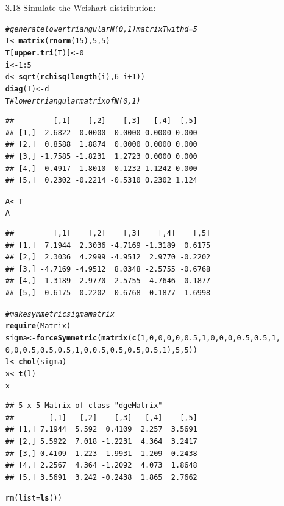 \documentclass{article}\usepackage[]{graphicx}\usepackage[]{color}
\makeatletter
\newcommand{\hlcom}[1]{\textcolor[rgb]{0.678,0.584,0.686}{\textit{#1}}}%
\newcommand{\hlkwd}[1]{\textcolor[rgb]{0.737,0.353,0.396}{\textbf{#1}}}%
\newenvironment{kframe}{%
 \def\at@end@of@kframe{}%
 \ifinner\ifhmode%
  \def\at@end@of@kframe{\end{minipage}}%
  \begin{minipage}{\columnwidth}%
 \fi\fi%
 \def\FrameCommand##1{\hskip\@totalleftmargin \hskip-\fboxsep
 \colorbox{shadecolor}{##1}\hskip-\fboxsep
     \hskip-\linewidth \hskip-\@totalleftmargin \hskip\columnwidth}%
 \MakeFramed {\advance\hsize-\width
   \@totalleftmargin\z@ \linewidth\hsize
   \@setminipage}}%
 {\par\unskip\endMakeFramed%
 \at@end@of@kframe}
\newenvironment{knitrout}{}{} %
\makeatother
\begin{document}
\begin{itemize}
\item[3.18]  Simulate the Weishart distribution:\\
\begin{knitrout}
\color{fgcolor}\begin{kframe}
\begin{alltt}
\hlcom{# generate lower triangular N(0,1) matrix T with d=5}
T <- \hlkwd{matrix}(\hlkwd{rnorm}(15), 5, 5)
T[\hlkwd{upper.tri}(T)] <- 0
i <- 1:5
d <- \hlkwd{sqrt}(\hlkwd{rchisq}(\hlkwd{length}(i), 6 - i + 1))
\hlkwd{diag}(T) <- d
T  \hlcom{#lower triangular matrix of \hlkwd{N}(0,1)}
\end{alltt}
\begin{verbatim}
##         [,1]    [,2]    [,3]   [,4]  [,5]
## [1,]  2.6822  0.0000  0.0000 0.0000 0.000
## [2,]  0.8588  1.8874  0.0000 0.0000 0.000
## [3,] -1.7585 -1.8231  1.2723 0.0000 0.000
## [4,] -0.4917  1.8010 -0.1232 1.1242 0.000
## [5,]  0.2302 -0.2214 -0.5310 0.2302 1.124
\end{verbatim}
\begin{alltt}
A <- T %
A
\end{alltt}
\begin{verbatim}
##         [,1]    [,2]    [,3]    [,4]    [,5]
## [1,]  7.1944  2.3036 -4.7169 -1.3189  0.6175
## [2,]  2.3036  4.2999 -4.9512  2.9770 -0.2202
## [3,] -4.7169 -4.9512  8.0348 -2.5755 -0.6768
## [4,] -1.3189  2.9770 -2.5755  4.7646 -0.1877
## [5,]  0.6175 -0.2202 -0.6768 -0.1877  1.6998
\end{verbatim}
\begin{alltt}
\hlcom{# make symmetric sigma matrix}
\hlkwd{require}(Matrix)
sigma <- \hlkwd{forceSymmetric}(\hlkwd{matrix}(\hlkwd{c}(1, 0, 0, 0, 0, 0.5, 1, 0, 0, 0, 0.5, 0.5, 1, 
    0, 0, 0.5, 0.5, 0.5, 1, 0, 0.5, 0.5, 0.5, 0.5, 1), 5, 5))
l <- \hlkwd{chol}(sigma)
x <- \hlkwd{t}(l) %
x
\end{alltt}
\begin{verbatim}
## 5 x 5 Matrix of class "dgeMatrix"
##        [,1]   [,2]    [,3]   [,4]    [,5]
## [1,] 7.1944  5.592  0.4109  2.257  3.5691
## [2,] 5.5922  7.018 -1.2231  4.364  3.2417
## [3,] 0.4109 -1.223  1.9931 -1.209 -0.2438
## [4,] 2.2567  4.364 -1.2092  4.073  1.8648
## [5,] 3.5691  3.242 -0.2438  1.865  2.7662
\end{verbatim}
\begin{alltt}
\hlkwd{rm}(list = \hlkwd{ls}())
\end{alltt}
\end{kframe}
\end{knitrout}



\end{itemize}
\end{document}
